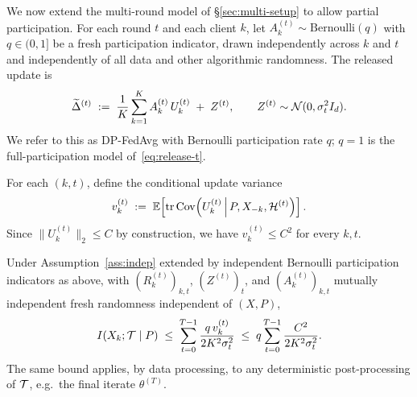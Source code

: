 We now extend the multi-round model of \S\ref{sec:multi-setup} to allow partial participation. For each round \(t\) and each client \(k\), let \(A_k^{(t)}\sim\mathrm{Bernoulli}(q)\) with \(q\in(0,1]\) be a fresh participation indicator, drawn independently across \(k\) and \(t\) and independently of all data and other algorithmic randomness. The released update is
\begin{equation}\label{eq:release-t-pp}
\widetilde{\Delta}^{(t)} \;:=\; \frac{1}{K}\sum_{k=1}^{K} A_k^{(t)}\,U_k^{(t)} \;+\; Z^{(t)},\qquad Z^{(t)}\sim\mathcal{N}(0,\sigma_t^2 I_d).
\end{equation}
We refer to this as DP-FedAvg with Bernoulli participation rate \(q\); \(q=1\) is the full-participation model of~\eqref{eq:release-t}.

For each \((k,t)\), define the conditional update variance
\begin{equation}\label{eq:vkt}
v_k^{(t)} \;:=\; \mathbb{E}\!\left[\operatorname{tr}\operatorname{Cov}\!\left(U_k^{(t)}\,\Big|\,P,X_{-k},\mathcal{H}^{(t)}\right)\right].
\end{equation}
Since \(\|U_k^{(t)}\|_2\le C\) by construction, we have \(v_k^{(t)}\le C^2\) for every \(k,t\).

\begin{theorem}\label{thm:var-pp}
Under Assumption~\ref{ass:indep} extended by independent Bernoulli participation indicators as above, with \((R_k^{(t)})_{k,t}\), \((Z^{(t)})_t\), and \((A_k^{(t)})_{k,t}\) mutually independent fresh randomness independent of \((X,P)\),
\begin{equation}\label{eq:var-pp}
I(X_k;\mathcal{T}\mid P)\;\le\;\sum_{t=0}^{T-1}\frac{q\,v_k^{(t)}}{2K^2\sigma_t^2}\;\le\;q\sum_{t=0}^{T-1}\frac{C^2}{2K^2\sigma_t^2}.
\end{equation}
The same bound applies, by data processing, to any deterministic post-processing of \(\mathcal{T}\), e.g.\ the final iterate \(\theta^{(T)}\).
\end{theorem}

